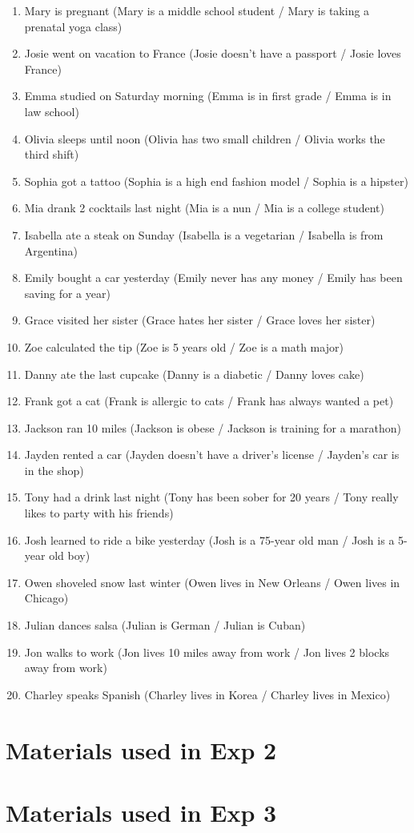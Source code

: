 \documentclass[11pt,fleqn]{article}
\newcommand{\6}{\mbox{$[\hspace*{-.6mm}[$}}
\newcommand{\9}{\mbox{$]\hspace*{-.6mm}]$}}
\begin{document}
\begin{enumerate}[leftmargin=3ex,itemsep=-2pt]
\item Mary is pregnant (Mary is a middle school student / Mary is taking a prenatal yoga class)
\item Josie went on vacation to France (Josie doesn't have a passport / Josie loves France)
\item Emma studied on Saturday morning (Emma is in first grade / Emma is in law school)
\item Olivia sleeps until noon (Olivia has two small children / Olivia works the third shift)
\item Sophia got a tattoo (Sophia is a high end fashion model / Sophia is a hipster)
\item Mia drank 2 cocktails last night (Mia is a nun / Mia is a college student)
\item Isabella ate a steak on Sunday (Isabella is a vegetarian / Isabella is from Argentina)
\item  Emily bought a car yesterday (Emily never has any money / Emily has been saving for a year)
\item  Grace visited her sister (Grace hates her sister / Grace loves her sister)
\item Zoe calculated the tip (Zoe is 5 years old / Zoe is a math major)
\item  Danny ate the last cupcake (Danny is a diabetic / Danny loves cake)
\item  Frank got a cat (Frank is allergic to cats / Frank has always wanted a pet)
\item  Jackson ran 10 miles (Jackson is obese / Jackson is training for a marathon)
\item  Jayden rented a car (Jayden doesn't have a driver's license / Jayden's car is in the shop)
\item  Tony had a drink last night (Tony has been sober for 20 years / Tony really likes to party with his friends)
\item  Josh learned to ride a bike yesterday (Josh is a 75-year old man / Josh is a 5-year old boy)
\item  Owen shoveled snow last winter (Owen lives in New Orleans / Owen lives in Chicago)
\item  Julian dances salsa (Julian is German / Julian is Cuban)
\item  Jon walks to work (Jon lives 10 miles away from work / Jon lives 2 blocks away from work)
\item  Charley speaks Spanish (Charley lives in Korea / Charley lives in Mexico)
\end{enumerate}

\clearpage


\section{Materials used in Exp 2}\label{a-exp2}

\section{Materials used in Exp 3}\label{a-exp3}



\end{document}
